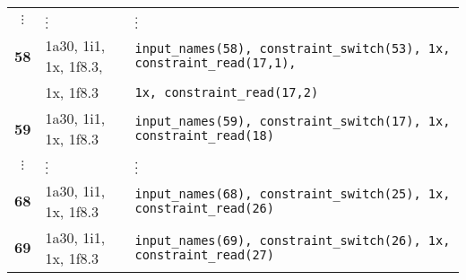 \documentclass[a4paper,11pt]{article}
\begin{document}
\begin{center}
\begin{tabular}{|c|l|l|}
 $\vdots$      & $\hfill \vdots \hfill$ & $\hfill \vdots \hfill$       \\
 \textbf{58}   & 1a30, 1i1, 1x, 1f8.3, & \tt input\_names(58), constraint\_switch(53), 1x, constraint\_read(17,1), \\
               &            1x, 1f8.3 & \tt                                           1x, constraint\_read(17,2) \\
 \textbf{59}   & 1a30, 1i1, 1x, 1f8.3 & \tt input\_names(59), constraint\_switch(17), 1x, constraint\_read(18) \\
 $\vdots$      & $\hfill \vdots \hfill$ & $\hfill \vdots \hfill$       \\
 \textbf{68}   & 1a30, 1i1, 1x, 1f8.3 & \tt input\_names(68), constraint\_switch(25), 1x, constraint\_read(26) \\
 \textbf{69}   & 1a30, 1i1, 1x, 1f8.3 & \tt input\_names(69), constraint\_switch(26), 1x, constraint\_read(27) \\
\hline
\end{tabular}
\end{center}
\end{document}
